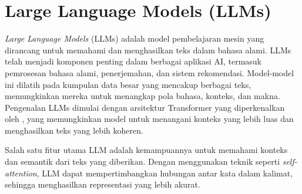 \section{Large Language Models (LLMs)}
\label{sec:llms}

\textit{Large Language Models} (LLMs) adalah model pembelajaran mesin yang dirancang untuk memahami dan menghasilkan teks dalam bahasa alami. LLMs telah menjadi komponen penting dalam berbagai aplikasi AI, termasuk pemrosesan bahasa alami, penerjemahan, dan sistem rekomendasi. Model-model ini dilatih pada kumpulan data besar yang mencakup berbagai teks, memungkinkan mereka untuk menangkap pola bahasa, konteks, dan makna. Pengenalan LLMs dimulai dengan arsitektur Transformer yang diperkenalkan oleh \textcite{vaswani2023attentionneed}, yang memungkinkan model untuk menangani konteks yang lebih luas dan menghasilkan teks yang lebih koheren.

Salah satu fitur utama LLM adalah kemampuannya untuk memahami konteks dan semantik dari teks yang diberikan. Dengan menggunakan teknik seperti \textit{self-attention}, LLM dapat mempertimbangkan hubungan antar kata dalam kalimat, sehingga menghasilkan representasi yang lebih akurat.